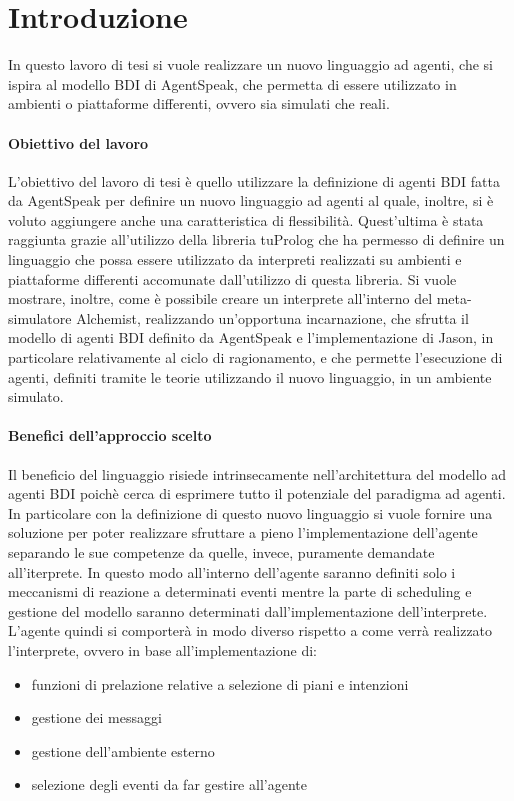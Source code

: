 \chapter{Introduzione}
\lhead[\fancyplain{}{\bfseries\thepage}]{\fancyplain{}{\bfseries\rightmark}}
In questo lavoro di tesi si vuole realizzare un nuovo linguaggio ad agenti, che si ispira al modello BDI di AgentSpeak, che permetta di essere utilizzato in ambienti o piattaforme differenti, ovvero sia simulati che reali.

\subsubsection{Obiettivo del lavoro}
L'obiettivo del lavoro di tesi è quello utilizzare la definizione di agenti BDI fatta da AgentSpeak per definire un nuovo linguaggio ad agenti al quale, inoltre, si è voluto aggiungere anche una caratteristica di flessibilità. Quest'ultima è stata raggiunta grazie all'utilizzo della libreria tuProlog che ha permesso di definire un linguaggio che possa essere utilizzato da interpreti realizzati su ambienti e piattaforme differenti accomunate dall'utilizzo di questa libreria. Si vuole mostrare, inoltre, come è possibile creare un interprete all'interno del meta-simulatore Alchemist, realizzando un'opportuna incarnazione, che sfrutta il modello di agenti BDI definito da AgentSpeak e l'implementazione di Jason, in particolare relativamente al ciclo di ragionamento, e che permette l'esecuzione di agenti, definiti tramite le teorie utilizzando il nuovo linguaggio, in un ambiente simulato.

\subsubsection{Benefici dell'approccio scelto}
Il beneficio del linguaggio risiede intrinsecamente nell'architettura del modello ad agenti BDI poichè cerca di esprimere tutto il potenziale del paradigma ad agenti. In particolare con la definizione di questo nuovo linguaggio si vuole fornire una soluzione per poter realizzare sfruttare a pieno l'implementazione dell'agente separando le sue competenze da quelle, invece, puramente demandate all'iterprete. In questo modo all'interno dell'agente saranno definiti solo i meccanismi di reazione a determinati eventi mentre la parte di scheduling e gestione del modello saranno determinati dall'implementazione dell'interprete. L'agente quindi si comporterà in modo diverso rispetto a come verrà realizzato l'interprete, ovvero in base all'implementazione di:
\begin{itemize}
\item funzioni di prelazione relative a selezione di piani e intenzioni
\item gestione dei messaggi
\item gestione dell'ambiente esterno
\item selezione degli eventi da far gestire all'agente
\end{itemize}
